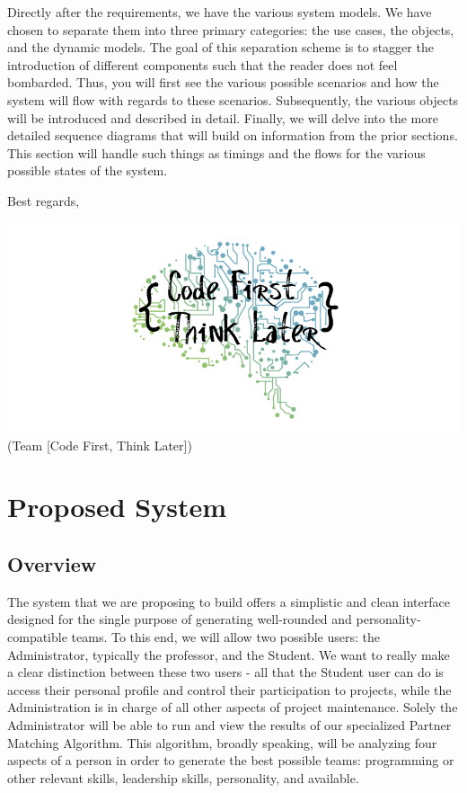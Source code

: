 \documentclass[12pt,letterpaper]{article}
\begin{document}
Directly after the requirements, we have the various system models. We have chosen to separate them into three
primary categories: the use cases, the objects, and the dynamic models. The goal of this separation scheme is to
stagger the introduction of different components such that the reader does not feel bombarded. Thus, you will 
first see the various possible scenarios and how the system will flow with regards to these scenarios. Subsequently, 
the various objects will be introduced and described in detail. Finally, we will delve into the more detailed sequence 
diagrams that will build on information from the prior sections. This section will handle such things as timings and
the flows for the various possible states of the system.

\vspace{1em}

\noindent Best regards,

\vspace{2em}

\begin{center}
	\includegraphics[scale=0.4]{imgs/logo.png} \\ \footnotesize{(Team [Code First, Think Later])}
\end{center}

\newpage{}

\section{Proposed System}

\subsection{Overview}

The system that we are proposing to build offers a simplistic and clean interface designed for the single purpose of generating 
well-rounded and personality-compatible teams. To this end, we will allow two possible users: the Administrator, typically the professor,
and the Student. We want to really make a clear distinction between these two users - all that the Student user can do is access their
personal profile and control their participation to projects, while the Administration is in charge of all other aspects of project maintenance. 
Solely the Administrator will be able to run and view the results of our specialized Partner Matching Algorithm. This algorithm, broadly speaking,
will be analyzing four aspects of a person in order to generate the best possible teams:  programming or other relevant skills, leadership skills,
personality, and available. 
\end{document}
